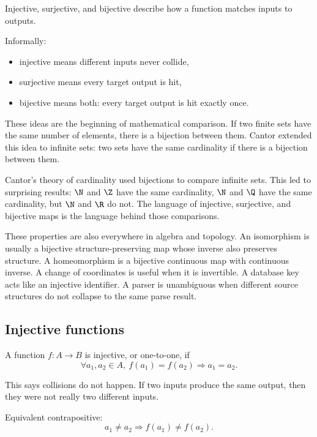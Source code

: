 Injective, surjective, and bijective describe how a function matches inputs to outputs.

Informally:

\begin{itemize}
\item injective means different inputs never collide,
\item surjective means every target output is hit,
\item bijective means both: every target output is hit exactly once.
\end{itemize}

These ideas are the beginning of mathematical comparison. If two finite sets have the same number of elements, there is a bijection between them. Cantor extended this idea to infinite sets: two sets have the same cardinality if there is a bijection between them.

\begin{historybox}
Cantor's theory of cardinality used bijections to compare infinite sets. This led to surprising results: $\N$ and $\Z$ have the same cardinality, $\N$ and $\Q$ have the same cardinality, but $\N$ and $\R$ do not. The language of injective, surjective, and bijective maps is the language behind those comparisons.
\end{historybox}

These properties are also everywhere in algebra and topology. An isomorphism is usually a bijective structure-preserving map whose inverse also preserves structure. A homeomorphism is a bijective continuous map with continuous inverse. A change of coordinates is useful when it is invertible. A database key acts like an injective identifier. A parser is unambiguous when different source structures do not collapse to the same parse result.

\subsection{Injective functions}

\begin{formalbox}
A function $f:A\to B$ is injective, or one-to-one, if
\[
\forall a_1,a_2\in A,\ f(a_1)=f(a_2)\Rightarrow a_1=a_2.
\]
\end{formalbox}

This says collisions do not happen. If two inputs produce the same output, then they were not really two different inputs.

Equivalent contrapositive:
\[
a_1\neq a_2\Rightarrow f(a_1)\neq f(a_2).
\]

